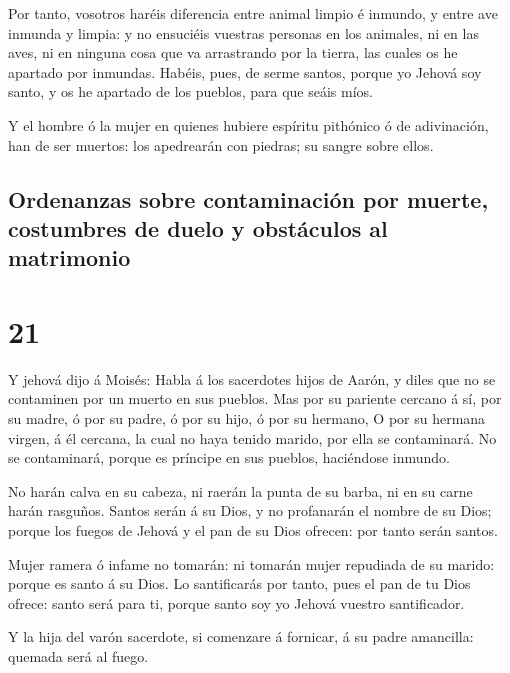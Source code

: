  Por tanto, vosotros haréis diferencia entre animal limpio
é inmundo, y entre ave inmunda y limpia: y no ensuciéis vuestras
personas en los animales, ni en las aves, ni en ninguna cosa que va
arrastrando por la tierra, las cuales os he apartado por inmundas.
 Habéis, pues, de serme santos, porque yo Jehová soy santo,
y os he apartado de los pueblos, para que seáis míos.

 Y el hombre ó la mujer en quienes hubiere espíritu
pithónico ó de adivinación, han de ser muertos: los apedrearán con
piedras; su sangre sobre ellos.

\hypertarget{ordenanzas-sobre-contaminaciuxf3n-por-muerte-costumbres-de-duelo-y-obstuxe1culos-al-matrimonio}{%
\subsection{Ordenanzas sobre contaminación por muerte, costumbres de
duelo y obstáculos al
matrimonio}\label{ordenanzas-sobre-contaminaciuxf3n-por-muerte-costumbres-de-duelo-y-obstuxe1culos-al-matrimonio}}

\hypertarget{section-20}{%
\section{21}\label{section-20}}

 Y jehová dijo á Moisés: Habla á los sacerdotes hijos de
Aarón, y diles que no se contaminen por un muerto en sus pueblos.
 Mas por su pariente cercano á sí, por su madre, ó por su
padre, ó por su hijo, ó por su hermano,  O por su hermana
virgen, á él cercana, la cual no haya tenido marido, por ella se
contaminará.  No se contaminará, porque es príncipe en sus
pueblos, haciéndose inmundo.

 No harán calva en su cabeza, ni raerán la punta de su
barba, ni en su carne harán rasguños.  Santos serán á su
Dios, y no profanarán el nombre de su Dios; porque los fuegos de Jehová
y el pan de su Dios ofrecen: por tanto serán santos.

 Mujer ramera ó infame no tomarán: ni tomarán mujer
repudiada de su marido: porque es santo á su Dios.  Lo
santificarás por tanto, pues el pan de tu Dios ofrece: santo será para
ti, porque santo soy yo Jehová vuestro santificador.

 Y la hija del varón sacerdote, si comenzare á fornicar, á
su padre amancilla: quemada será al fuego.

